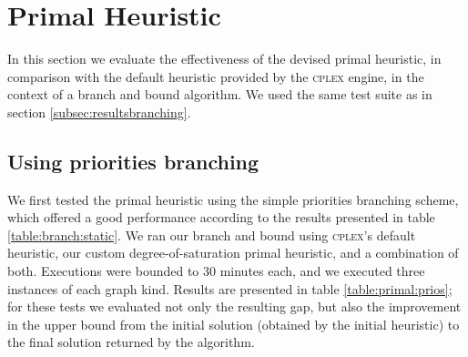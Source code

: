 
\section{Primal Heuristic}
\label{subsec:resultsprimal}

In this section we evaluate the effectiveness of the devised primal heuristic, in comparison with the default heuristic provided by the \textsc{cplex} engine, in the context of a branch and bound algorithm. We used the same test suite as in section \ref{subsec:resultsbranching}.

\subsection{Using priorities branching}

We first tested the primal heuristic using the simple priorities branching scheme, which offered a good performance according to the results presented in table \ref{table:branch:static}. We ran our branch and bound using \textsc{cplex}'s default heuristic, our custom degree-of-saturation primal heuristic, and a combination of both. Executions were bounded to 30 minutes each, and we executed three instances of each graph kind. Results are presented in table \ref{table:primal:prios}; for these tests we evaluated not only the resulting gap, but also the improvement in the upper bound from the initial solution (obtained by the initial heuristic) to the final solution returned by the algorithm.

